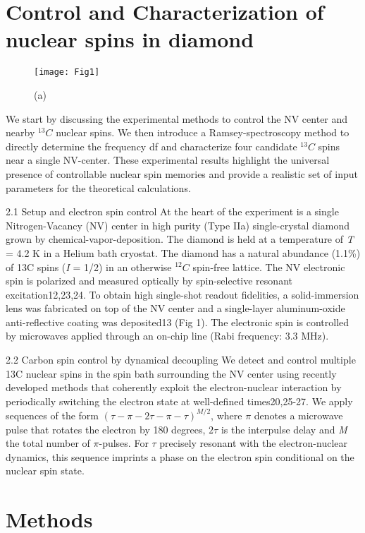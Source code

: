 \section{Control and Characterization of nuclear spins in diamond}
\begin{figure*}
	\centering
	\texttt{[image: Fig1]}
	\caption{\label{fig:cdl-fig1} \textbf{} (a) }
\end{figure*}

We start by discussing the experimental methods to control the NV center and nearby $^{13}C$  nuclear spins. We then introduce a Ramsey-spectroscopy method to directly determine the frequency df and characterize four candidate $^{13}C$  spins near a single NV-center. These experimental results highlight the universal presence of controllable nuclear spin memories and provide a realistic set of input parameters for the theoretical calculations.

2.1 Setup and electron spin control
At the heart of the experiment is a single Nitrogen-Vacancy (NV) center in high purity (Type IIa) single-crystal diamond grown by chemical-vapor-deposition. The diamond is held at a temperature of \textit{T} = 4.2 K in a Helium bath cryostat. The diamond has a natural abundance (1.1\%) of 13C spins (\textit{I} = 1/2) in an otherwise $^{12}C$ spin-free lattice. The NV electronic spin is polarized and measured optically by spin-selective resonant excitation12,23,24. To obtain high single-shot readout fidelities, a solid-immersion lens was fabricated on top of the NV center and a single-layer aluminum-oxide anti-reflective coating was deposited13 (Fig 1). The electronic spin is controlled by microwaves applied through an on-chip line (Rabi frequency: 3.3 MHz).     

2.2 Carbon spin control by dynamical decoupling
We detect and control multiple 13C nuclear spins in the spin bath surrounding the NV center using recently developed methods that coherently exploit the electron-nuclear interaction by periodically switching the electron state at well-defined times20,25-27. We apply sequences of the form $(\tau - \pi - 2\tau - \pi - \tau)^{M/2}$, where $\pi$ denotes a microwave pulse that rotates the electron by 180 degrees, $2\tau$ is the interpulse delay and \textit{M} the total number of $\pi$-pulses. For $\tau$ precisely resonant with the electron-nuclear dynamics, this sequence imprints a phase on the electron spin conditional on the nuclear spin state. 


\section{Methods}



\newpage
%
%


